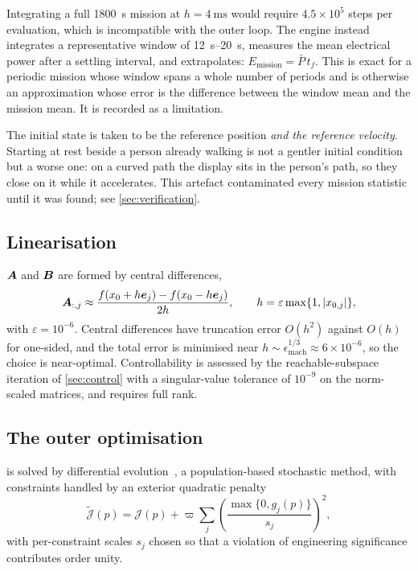 \begin{remark}
Integrating a full \SI{1800}{\second} mission at $h=\SI{4}{\milli\second}$ would
require $4.5\times10^5$ steps per evaluation, which is incompatible with the
outer loop. The engine instead integrates a representative window of
\SIrange{12}{20}{\second}, measures the mean electrical power after a settling
interval, and extrapolates:
$E_{\mathrm{mission}} = \bar P\,t_f$. This is exact for a periodic mission whose
window spans a whole number of periods and is otherwise an approximation whose
error is the difference between the window mean and the mission mean. It is
recorded as a limitation.
\end{remark}

\begin{remark}
The initial state is taken to be the reference position \emph{and the reference
velocity}. Starting at rest beside a person already walking is not a gentler
initial condition but a worse one: on a curved path the display sits in the
person's path, so they close on it while it accelerates. This artefact
contaminated every mission statistic until it was found; see
\cref{sec:verification}.
\end{remark}

\subsection{Linearisation}

$\bm{A}$ and $\bm{B}$ are formed by central differences,
\begin{equation}
  \bm{A}_{:,j} \approx \frac{f(x_0+h\bm{e}_j)-f(x_0-h\bm{e}_j)}{2h},
  \qquad h = \varepsilon\max\{1,|x_{0,j}|\},
  \label{eq:fd}
\end{equation}
with $\varepsilon=10^{-6}$. Central differences have truncation error $O(h^2)$
against $O(h)$ for one-sided, and the total error is minimised near
$h\sim\epsilon_{\mathrm{mach}}^{1/3}\approx6\times10^{-6}$, so the choice is
near-optimal. Controllability is assessed by the reachable-subspace iteration
of \cref{sec:control} with a singular-value tolerance of $10^{-9}$ on the
norm-scaled matrices, and requires full rank.

\subsection{The outer optimisation}

 is solved by differential evolution~\cite{storn1997}, a
population-based stochastic method, with constraints handled by an exterior
quadratic penalty
\begin{equation}
  \tilde{\mathcal{J}}(p) = \mathcal{J}(p)
    + \varpi\sum_j \left(\frac{\max\{0,g_j(p)\}}{s_j}\right)^{2} ,
  \label{eq:penalty}
\end{equation}
with per-constraint scales $s_j$ chosen so that a violation of engineering
significance contributes order unity.

